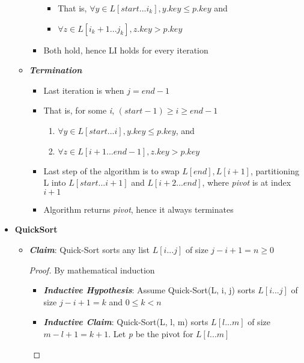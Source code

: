 \documentclass[10pt, 
a4paper, 
oneside, 
headinclude, footinclude, 
BCOR5mm]
{scrartcl}
\begin{document}
\begin{definition}
\begin{itemize}
\begin{itemize}
\begin{itemize}
\begin{itemize}
                    \item That is, $\forall y\in L[start...i_{k}], y.key \leq p.key$ and
                    \item $\forall z\in L[i_{k}+1...j_{k}],z.key>p.key$ 
                \end{itemize}
                \item Both hold, hence LI holds for every iteration
            \end{itemize}
            \item \textbf{\textit{Termination}}
            \begin{itemize}
                \item Last iteration is when $j=end-1$
                \item That is, for some \textit{i}, $(start-1)\geq i \geq end-1$
                \begin{enumerate}
                    \item $\forall y\in L[start...i], y.key \leq p.key$, and
                    \item $\forall z\in L[i+1...end-1],z.key>p.key$
                \end{enumerate}
                \item Last step of the algorithm is to swap $L[end], L[i+1]$, partitioning L into $L[start...i+1]$ and $L[i+2...end]$, where \textit{pivot} is at index $i+1$
                \item Algorithm returns \textit{pivot}, hence it always terminates
            \end{itemize}
        \end{itemize}
        \item \textbf{QuickSort}
        \begin{itemize}
            \item \textbf{\textit{Claim}}: Quick-Sort sorts any list $L[i...j]$ of size $j-i+1=n\geq 0$
            \begin{proof}
                By mathematical induction
                \begin{itemize}
                    \item \textit{\textbf{Inductive Hypothesis}}: Assume Quick-Sort(L, i, j) sorts $L[i...j]$ of size $j-i+1=k$ and $0\leq k<n$
                    \item \textit{\textbf{Inductive Claim}}: Quick-Sort(L, l, m) sorts $L[l...m]$ of size $m-l+1=k+1$. Let \textit{p} be the pivot for $L[l...m]$
                    \begin{itemize}

\end{itemize}
\end{itemize}
\end{proof}
\end{itemize}
\end{itemize}
\end{definition}
\end{document}
